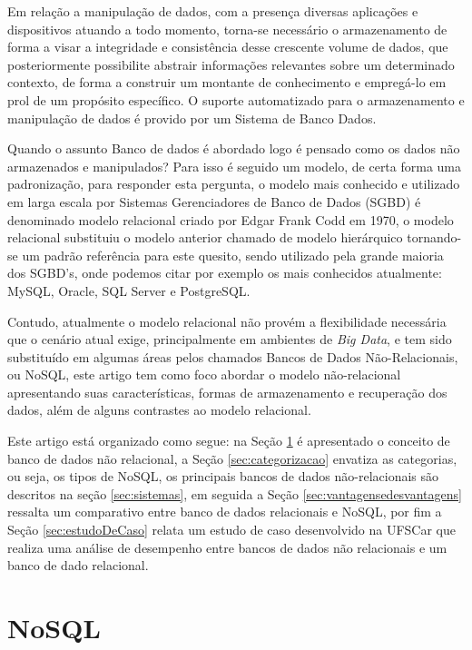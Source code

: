 \documentclass[12pt]{article}
\begin{document}
Em relação a manipulação de dados, com a presença diversas aplicações e dispositivos atuando a todo momento, torna-se necessário o armazenamento de forma a visar a integridade e consistência desse crescente volume de dados, que posteriormente possibilite abstrair informações relevantes sobre um determinado contexto, de forma a construir um montante de conhecimento e empregá-lo em prol de um propósito específico. O suporte automatizado para o armazenamento e manipulação de dados é provido por um Sistema de Banco Dados.

Quando o assunto Banco de dados é abordado logo é pensado como os dados não armazenados e manipulados? Para isso é seguido um modelo, de certa forma uma padronização, para responder esta pergunta, o modelo mais conhecido e utilizado em larga escala por Sistemas Gerenciadores de Banco de Dados (SGBD) é denominado modelo relacional \cite{codd:1970} criado por Edgar Frank Codd em 1970, o modelo relacional substituiu o modelo anterior chamado de modelo hierárquico tornando-se um padrão referência para este quesito, sendo utilizado pela grande maioria dos SGBD's, onde podemos citar por exemplo os mais conhecidos atualmente: MySQL, Oracle, SQL Server e PostgreSQL.\cite{brito2010bancos}

Contudo, atualmente o modelo relacional não provém a flexibilidade necessária que o cenário atual exige, principalmente em ambientes de \textit{Big Data}, e tem sido substituído em algumas áreas pelos chamados Bancos de Dados Não-Relacionais, ou NoSQL, este artigo tem como foco abordar o modelo não-relacional apresentando suas características, formas de armazenamento e recuperação dos dados, além de alguns contrastes ao modelo relacional.

Este artigo está organizado como segue: na Seção \ref{sec:nosql} é apresentado o conceito de banco de dados não relacional, a Seção \ref{sec:categorizacao} envatiza as categorias, ou seja, os tipos de NoSQL, os principais bancos de dados não-relacionais são descritos na seção \ref{sec:sistemas}, em seguida a Seção \ref{sec:vantagensedesvantagens} ressalta um comparativo entre banco de dados relacionais e NoSQL, por fim a Seção \ref{sec:estudoDeCaso} relata um estudo de caso desenvolvido na UFSCar que realiza uma análise de desempenho entre bancos de dados não relacionais e um banco de dado relacional.

\section{NoSQL} 
\label{sec:nosql}
\end{document}
